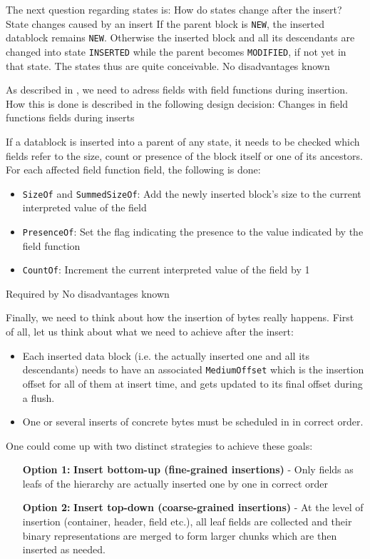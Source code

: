 The next question regarding states is: How do states change after the insert?
{%
State changes caused by an insert
}
{%
If the parent block is \texttt{NEW}, the inserted datablock remains \texttt{NEW}. Otherwise the inserted block and all its descendants are changed into state \texttt{INSERTED} while the parent becomes \texttt{MODIFIED}, if not yet in that state.
}
{%
The states thus are quite conceivable.
}
{%
No disadvantages known
}

As described in , we need to adress fields with field functions during insertion. How this is done is described in the following design decision:
{%
Changes in field functions fields during inserts
}
{%
  If a datablock is inserted into a parent of any state, it needs to be checked which fields refer to the size, count or presence of the block itself or one of its ancestors. For each affected field function field, the following is done:
  \begin{itemize}
  \item \texttt{SizeOf} and \texttt{SummedSizeOf}: Add the newly inserted block's size to the current interpreted value of the field
  \item \texttt{PresenceOf}: Set the flag indicating the presence to the value indicated by the field function
  \item \texttt{CountOf}: Increment the current interpreted value of the field by 1
  \end{itemize}
}
{%
Required by 
}
{%
No disadvantages known
}

Finally, we need to think about how the insertion of bytes really happens. First of all, let us think about what we need to achieve after the insert:
\begin{itemize}
\item Each inserted data block (i.e. the actually inserted one and all its descendants) needs to have an associated \texttt{MediumOffset} which is the insertion offset for all of them at insert time, and gets updated to its final offset during a flush.
\item One or several inserts of concrete bytes must be scheduled in \COMPmedia{} in correct order.
\end{itemize}

One could come up with two distinct strategies to achieve these goals:
\begin{enumerate}
\item [\textbf{Option 1:}] \textbf{Insert bottom-up (fine-grained insertions)} - Only fields as leafs of the hierarchy are actually inserted one by one in correct order
\item [\textbf{Option 2:}] \textbf{Insert top-down (coarse-grained insertions)} - At the level of insertion (container, header, field etc.), all leaf fields are collected and their binary representations are merged to form larger chunks which are then inserted as needed.
\end{enumerate}

